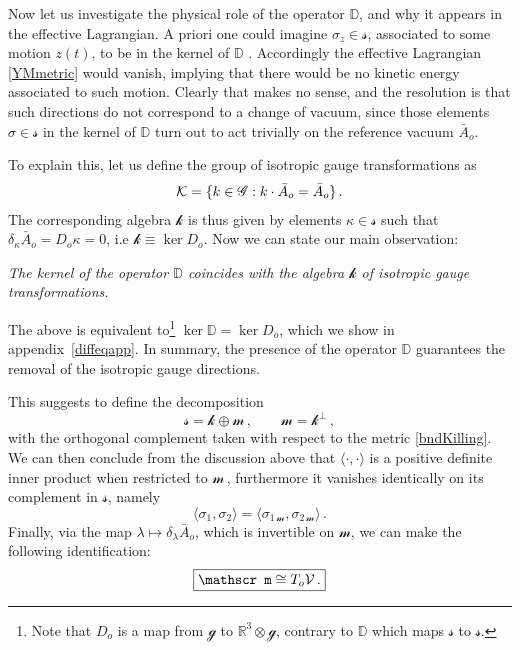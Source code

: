 \documentclass[11pt,a4paper]{article}
\def\calg{{\mathscr G}}
\def\calk{{\cal K}}
\def\calsk{\boldsymbol{\mathscr k}}
\def\calsg{{\boldsymbol{\mathscr g}}}
\def\calsm{{\boldsymbol{\mathscr m}}}
\def\calss{{\boldsymbol{\mathscr s}}}
\def\calv{{\cal V}}
\def\de{\delta}
\def\Dperp{{\mathbb{D}}}
\begin{document}
    Now let us investigate the physical role of the operator $\Dperp$, and why it appears in the effective Lagrangian. A priori one could imagine $\sigma_z\in \calss$, associated to some motion $z(t)$, to be in the kernel of $\Dperp$ . Accordingly the effective Lagrangian \eqref{YMmetric} would vanish, implying that there would be no kinetic energy associated to such motion. Clearly that makes no sense, and the resolution is that such directions do not correspond to a change of vacuum, since those elements $\sigma\in \calss$ in the kernel of $\Dperp$ turn out to act trivially on the reference vacuum $\bar A_o$.
    
    To explain this, let us define the group of isotropic gauge transformations  as 
        \begin{align}
        \calk=\{k\in\calg: k\cdot \bar A_o=\bar A_o \}\,.
        \end{align}
    The corresponding algebra $\calsk$ is thus given by elements $\kappa\in\calss$ such that $\de_{\kappa}\bar A_o=D_o\kappa=0$, i.e $\calsk\equiv\ker D_o$. Now we can state our main observation:
\begin{center}
    \textit{The kernel of the operator $\Dperp$ coincides with the algebra $\calsk$ of isotropic gauge transformations.}
\end{center}
    The above is equivalent to\footnote{Note that $D_o$ is a map from $\calsg$ to $\mathbb{R}^3\otimes \calsg$, contrary to $\Dperp$ which maps $\calss$ to $\calss$.} $\ker \Dperp=\ker D_o$, which we show in appendix~\ref{diffeqapp}. In summary, the presence of the operator $\Dperp$ guarantees the removal of the isotropic gauge directions.


 	This suggests to define the decomposition
	\begin{equation}
	\calss=\calsk\oplus \calsm\,,\qquad \calsm=\calsk^\perp\,,\label{algebradecomp}
	\end{equation}
	with the orthogonal complement taken with respect to the metric \eqref{bndKilling}. We can then conclude from the discussion above that $\langle\cdot,\cdot\rangle$ is a positive definite inner product when restricted to $\calsm$\,, furthermore it vanishes identically on its complement in $\calss$, namely
	\begin{equation}
	\langle\sigma_1,\sigma_2\rangle=\langle\sigma_{1\,\calsm},\sigma_{2\,\calsm}\rangle\,.
	\end{equation} Finally, via the map $\lambda \mapsto \delta_\lambda \bar A_o$, which is invertible on $\calsm$, we can make the following identification:
	\begin{equation}
\boxed{	\calsm\cong T_o\calv\,.}\label{tangid}
	\end{equation}
	
\end{document}
